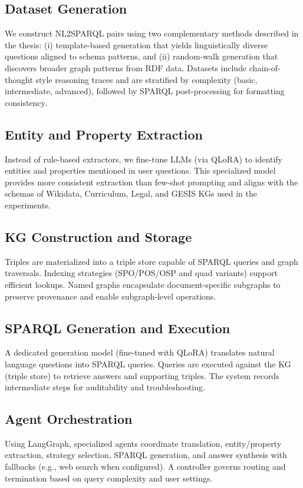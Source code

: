 \documentclass[12pt,a4paper,onecolumn]{article}
\begin{document}
\subsection*{Dataset Generation}
We construct NL2SPARQL pairs using two complementary methods described in the thesis: (i) template-based generation that yields linguistically diverse questions aligned to schema patterns, and (ii) random-walk generation that discovers broader graph patterns from RDF data. Datasets include chain-of-thought style reasoning traces and are stratified by complexity (basic, intermediate, advanced), followed by SPARQL post-processing for formatting consistency.

\subsection*{Entity and Property Extraction}
Instead of rule-based extractors, we fine-tune LLMs (via QLoRA) to identify entities and properties mentioned in user questions. This specialized model provides more consistent extraction than few-shot prompting and aligns with the schemas of Wikidata, Curriculum, Legal, and GESIS KGs used in the experiments.

\subsection*{KG Construction and Storage}
Triples are materialized into a triple store capable of SPARQL queries and graph traversals. Indexing strategies (SPO/POS/OSP and quad variants) support efficient lookups. Named graphs encapsulate document-specific subgraphs to preserve provenance and enable subgraph-level operations.

\subsection*{SPARQL Generation and Execution}
A dedicated generation model (fine-tuned with QLoRA) translates natural language questions into SPARQL queries. Queries are executed against the KG (triple store) to retrieve answers and supporting triples. The system records intermediate steps for auditability and troubleshooting.

\subsection*{Agent Orchestration}
Using LangGraph, specialized agents coordinate translation, entity/property extraction, strategy selection, SPARQL generation, and answer synthesis with fallbacks (e.g., web search when configured). A controller governs routing and termination based on query complexity and user settings.
\end{document}
